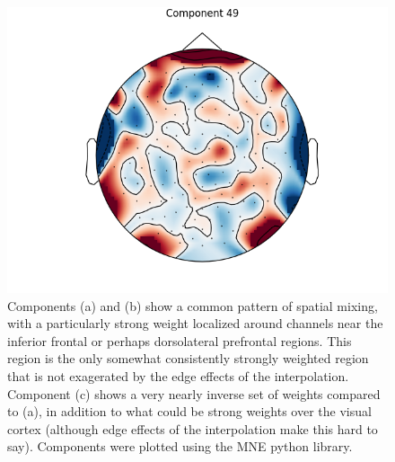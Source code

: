 \documentclass[utf8]{frontiersSCNS} %
\begin{document}
\begin{figure}[h!]
\begin{minipage}{0.31\textwidth}
    \includegraphics[width=\linewidth]{max_act/49.png}
    \subcaption{}
  \end{minipage}
  \caption[textfind]{Components (a) and (b) show a common pattern of spatial mixing, with a particularly strong weight localized around channels near the inferior frontal or perhaps dorsolateral prefrontal regions. This region is the only somewhat consistently strongly weighted region that is not exagerated by the edge effects of the interpolation. Component (c) shows a very nearly inverse set of weights compared to (a), in addition to what could be strong weights over the visual cortex (although edge effects of the interpolation make this hard to say). Components were plotted using the MNE python library. \footnotemark} \label{fig:max_components}
\end{figure}
\end{document}

